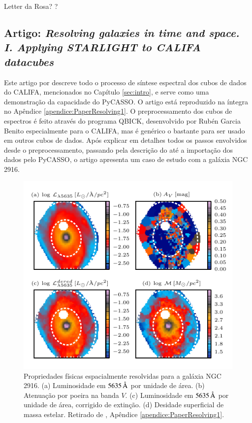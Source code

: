\TODO Letter da Rosa? \citet{IglesiasParamo2013}?



\subsection{Artigo: {\em Resolving galaxies in time and space. I. Applying
STARLIGHT to CALIFA datacubes}}
\label{sec:pycasso:art:Resolving1}

Este artigo por \citet{CidFernandes2013} descreve todo o processo de síntese
espectral dos cubos de dados do CALIFA, mencionados no Capítulo \ref{sec:intro},
e serve como uma demonstração da capacidade do PyCASSO. O artigo está
reproduzido na íntegra no Apêndice \ref{apendice:PaperResolving1}. O
preprocessamento dos cubos de espectros é feito através do programa QBICK,
desenvolvido por Rubén Garcia Benito especialmente para o CALIFA, mas é genérico
o bastante para ser usado em outros cubos de dados. Após explicar em detalhes
todos os passos envolvidos desde o preprocessamento, passando pela descrição do
\starlight até a importação dos dados pelo PyCASSO, o artigo apresenta um caso
de estudo com a galáxia NGC 2916.

\begin{figure}
	\includegraphics{figuras/L-M-AV-K0277}
	\caption[Propriedades físicas espacialmente resolvidas para a galáxia NGC
	2916] {Propriedades físicas espacialmente resolvidas para a galáxia NGC 2916. (a)
	Luminosidade em $5635\,\text{\normalfont\AA}$ por unidade de área. (b) Atenuação por
	poeira na banda $V$. (c) Luminosidade em $5635\,\text{\normalfont\AA}$ por unidade de área,
	corrigido de extinção. (d) Desidade superficial de massa estelar. Retirado de
	\cite[figura 4]{CidFernandes2013}, Apêndice \ref{apendice:PaperResolving1}.}
	\label{fig:LMAVMap}
\end{figure}


